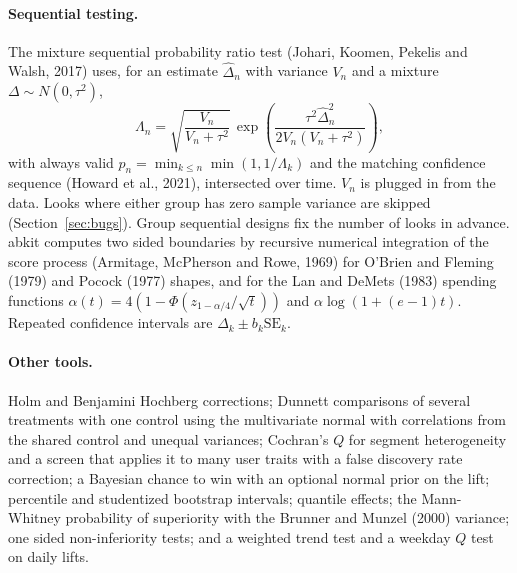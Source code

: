 \documentclass[10pt]{article}
\begin{document}
\paragraph{Sequential testing.} The mixture sequential probability ratio test (Johari, Koomen, Pekelis and Walsh, 2017) uses, for an estimate $\hat\Delta_n$ with variance $V_n$ and a mixture $\Delta \sim N(0,\tau^2)$,
\[ \Lambda_n = \sqrt{\frac{V_n}{V_n + \tau^2}}\,\exp\!\left(\frac{\tau^2 \hat\Delta_n^2}{2 V_n (V_n + \tau^2)}\right), \]
with always valid $p_n = \min_{k \le n} \min(1, 1/\Lambda_k)$ and the matching confidence sequence (Howard et al., 2021), intersected over time. $V_n$ is plugged in from the data. Looks where either group has zero sample variance are skipped (Section~\ref{sec:bugs}). Group sequential designs fix the number of looks in advance. abkit computes two sided boundaries by recursive numerical integration of the score process (Armitage, McPherson and Rowe, 1969) for O'Brien and Fleming (1979) and Pocock (1977) shapes, and for the Lan and DeMets (1983) spending functions $\alpha(t) = 4\left(1 - \Phi\!\left(z_{1-\alpha/4}/\sqrt t\right)\right)$ and $\alpha \log(1 + (e-1)t)$. Repeated confidence intervals are $\hat\Delta_k \pm b_k \mathrm{SE}_k$.

\paragraph{Other tools.} Holm and Benjamini Hochberg corrections; Dunnett comparisons of several treatments with one control using the multivariate normal with correlations from the shared control and unequal variances; Cochran's $Q$ for segment heterogeneity and a screen that applies it to many user traits with a false discovery rate correction; a Bayesian chance to win with an optional normal prior on the lift; percentile and studentized bootstrap intervals; quantile effects; the Mann-Whitney probability of superiority with the Brunner and Munzel (2000) variance; one sided non-inferiority tests; and a weighted trend test and a weekday $Q$ test on daily lifts.
\end{document}
